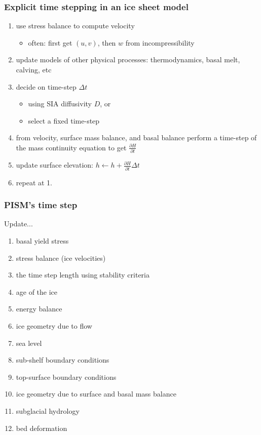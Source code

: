 \documentclass[hide notes,intlimits]{beamer}
\newcommand{\diff}[2]{\frac{\partial #1}{\partial #2}}
\begin{document}
\begin{frame}
  \frametitle{Explicit time stepping in an ice sheet model}

  \begin{enumerate}
  \item use stress balance to compute velocity
    \begin{itemize}
    \item often: first get $(u,v)$, then $w$ from incompressibility
    \end{itemize}
  \item update models of other physical processes: thermodynamics, basal melt, calving, etc
  \item decide on time-step $\Delta t$
    \begin{itemize}
    \item using SIA diffusivity $D$, or
    \item select a fixed time-step
    \end{itemize}
  \item from velocity, surface mass balance, and basal balance perform
    a time-step of the mass continuity equation to get $\diff{H}{t}$
  \item update surface elevation: $h \gets h + \diff{H}{t} \Delta t$
  \item repeat at 1.
  \end{enumerate}
\end{frame}

\begin{frame}
  \frametitle{PISM's time step}
  Update...
  \begin{enumerate}
  \item basal yield stress
  \item stress balance (ice velocities)
  \item the time step length using stability criteria
  \item age of the ice
  \item energy balance
  \item ice geometry due to flow
  \item sea level
  \item sub-shelf boundary conditions
  \item top-surface boundary conditions
  \item ice geometry due to surface and basal mass balance
  \item subglacial hydrology
  \item bed deformation
  \end{enumerate}
\end{frame}
\end{document}

